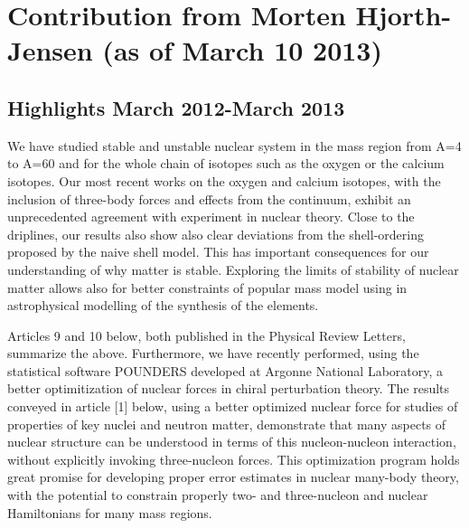 \documentclass[prc,amsart,english,twocolumn,superscriptaddress,showpacs,floatfix]{revtex4}
\begin{document}
 \section*{Contribution from Morten Hjorth-Jensen (as of March 10 2013)}


 \subsection*{Highlights March 2012-March 2013}

We have studied stable and unstable 
nuclear system in the mass region from A=4 to A=60 and for the whole chain of isotopes such as the oxygen or the 
calcium isotopes. Our most recent works on the oxygen and calcium isotopes, with the inclusion of three-body forces and  
effects from the continuum, 
exhibit an unprecedented agreement with experiment in nuclear theory. Close to the driplines, our results also show also clear deviations from 
the shell-ordering proposed by the naive shell model. 
This has important consequences for our understanding of
 why matter is stable. Exploring the limits of stability of nuclear matter allows also for better constraints of popular
 mass model using in astrophysical modelling of the synthesis of the elements. 

Articles 9 and 10 below, both published in the Physical Review Letters, summarize the above.
Furthermore, we have recently performed, using the statistical software POUNDERS developed at Argonne National Laboratory, 
a better optimitization of nuclear forces in chiral perturbation theory. The results conveyed in article [1] below, using a better optimized nuclear force
for studies of properties of key nuclei and neutron matter, 
demonstrate that many aspects of nuclear structure can be understood in terms of this 
nucleon-nucleon interaction, without explicitly invoking three-nucleon forces.
This optimization program holds great promise for developing proper error estimates in nuclear many-body theory, with the potential to constrain
properly two- and three-nucleon and nuclear Hamiltonians for many mass regions.  
\end{document}
